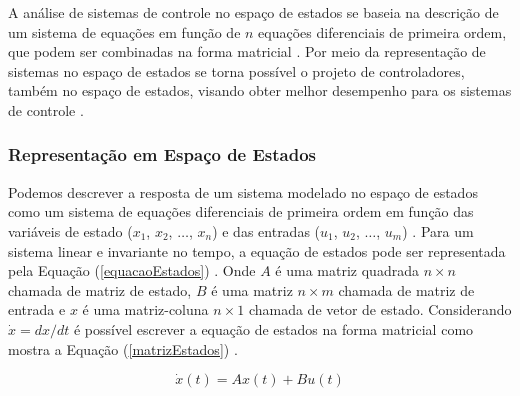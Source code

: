 \documentclass[journal,brazil,english]{IEEEtran}
\begin{document}
A análise de sistemas de controle no espaço de estados se baseia na descrição de um sistema de equações em função de $n$ equações diferenciais de primeira ordem, que podem ser combinadas na forma matricial \cite{ogata}. Por meio da representação de sistemas no espaço de estados se torna possível o projeto de controladores, também no espaço de estados, visando obter melhor desempenho para os sistemas de controle \cite{dorf}.

\subsubsection{Representação em Espaço de Estados}
Podemos descrever a resposta de um sistema modelado no espaço de estados como um sistema de equações diferenciais de primeira ordem em função das variáveis de estado ($x_1$, $x_2$, $\ldots$, $x_n$) e das entradas ($u_1$, $u_2$, $\ldots$, $u_m$) \cite{dorf}. Para um sistema linear e invariante no tempo, a equação de estados pode ser representada pela Equação (\ref{equacaoEstados}) \cite{ogata}. Onde $A$ é uma matriz quadrada $n \times n$ chamada de matriz de estado, $B$ é uma matriz $n \times m$ chamada de matriz de entrada e $x$ é uma matriz-coluna $n \times 1$ chamada de vetor de estado. Considerando $\dot{x} = {dx}/{dt}$ é possível escrever a equação de estados na forma matricial como mostra a Equação (\ref{matrizEstados}) \cite{dorf}.

\begin{equation}\label{equacaoEstados}
\dot{x}(t) = Ax(t)+Bu(t)
\end{equation}
\end{document}
